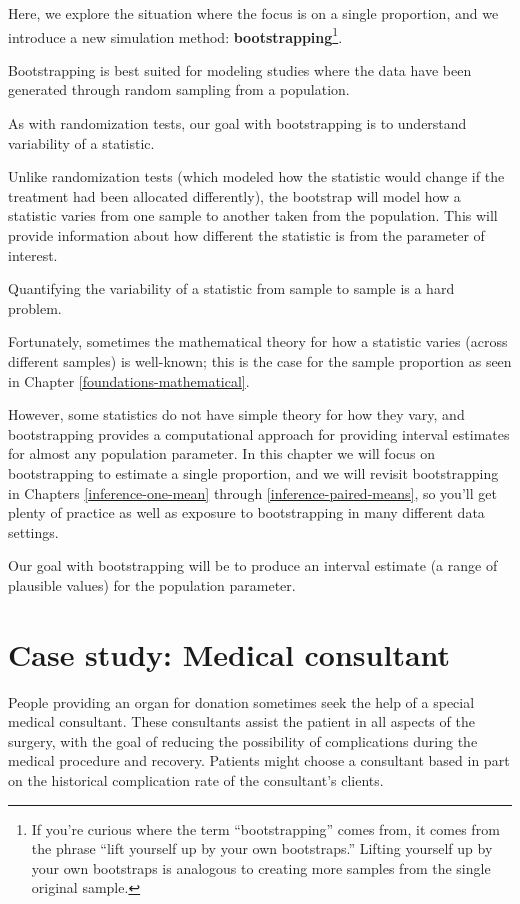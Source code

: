 \documentclass[
  10pt,
  openany]{book}
\theoremstyle{definition}
\theoremstyle{definition}
\theoremstyle{definition}
\theoremstyle{definition}
\theoremstyle{remark}
\begin{document}
Here, we explore the situation where the focus is on a single proportion, and we introduce a new simulation method: \textbf{bootstrapping}\footnote{If you're curious where the term ``bootstrapping'' comes from, it comes from the phrase ``lift yourself up by your own bootstraps.'' Lifting yourself up by your own bootstraps is analogous to creating more samples from the single original sample.}.

Bootstrapping is best suited for modeling studies where the data have been generated through random sampling from a population.

As with randomization tests, our goal with bootstrapping is to understand variability of a statistic.

Unlike randomization tests (which modeled how the statistic would change if the treatment had been allocated differently), the bootstrap will model how a statistic varies from one sample to another taken from the population.
This will provide information about how different the statistic is from the parameter of interest.

Quantifying the variability of a statistic from sample to sample is a hard problem.

Fortunately, sometimes the mathematical theory for how a statistic varies (across different samples) is well-known; this is the case for the sample proportion as seen in Chapter \ref{foundations-mathematical}.

However, some statistics do not have simple theory for how they vary, and bootstrapping provides a computational approach for providing interval estimates for almost any population parameter.
In this chapter we will focus on bootstrapping to estimate a single proportion, and we will revisit bootstrapping in Chapters \ref{inference-one-mean} through \ref{inference-paired-means}, so you'll get plenty of practice as well as exposure to bootstrapping in many different data settings.

Our goal with bootstrapping will be to produce an interval estimate (a range of plausible values) for the population parameter.

\section{Case study: Medical consultant}\label{case-study-med-consult}

People providing an organ for donation sometimes seek the help of a special medical consultant.
These consultants assist the patient in all aspects of the surgery, with the goal of reducing the possibility of complications during the medical procedure and recovery.
Patients might choose a consultant based in part on the historical complication rate of the consultant's clients.
\end{document}
